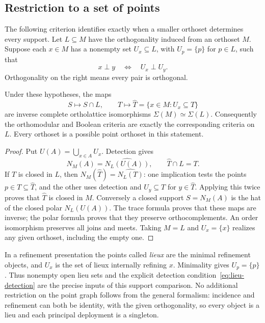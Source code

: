 \subsection{Restriction to a set of points}
The following criterion identifies exactly when a smaller orthoset
determines every support. Let $L\subseteq M$ have the orthogonality
induced from an orthoset $M$. Suppose each $x\in M$ has a nonempty
set $U_x\subseteq L$, with $U_p=\{p\}$ for $p\in L$, such that
\begin{equation}\label{eq:lieu-detection}
 x\perp y\quad\Longleftrightarrow\quad U_x\perp U_y.
\end{equation}
Orthogonality on the right means every pair is orthogonal.

\begin{proposition}\label{prop:lieu-supports}
Under these hypotheses, the maps
\[
 S\longmapsto S\cap L,\qquad
 T\longmapsto\widehat T=\{x\in M:U_x\subseteq T\}
\]
are inverse complete ortholattice isomorphisms
$\Sigma(M)\simeq\Sigma(L)$.
Consequently the orthomodular and Boolean criteria are exactly
the corresponding criteria on $L$. Every orthoset is a possible
point orthoset in this statement.
\end{proposition}
\begin{proof}
Put $U(A)=\bigcup_{x\in A}U_x$. Detection gives
\[
 N_M(A)=\widehat{N_L(U(A))},\qquad
 \widehat T\cap L=T.
\]
If $T$ is closed in $L$, then
$N_M(\widehat T)=\widehat{N_L(T)}$: one implication tests the
points $p\in T\subseteq\widehat T$, and the other uses detection
and $U_y\subseteq T$ for $y\in\widehat T$. Applying this twice
proves that $\widehat T$ is closed in $M$. Conversely a closed
support $S=N_M(A)$ is the hat of the closed polar $N_L(U(A))$.
The trace formula proves that these maps are inverse; the polar
formula proves that they preserve orthocomplements. An order
isomorphism preserves all joins and meets. Taking $M=L$ and
$U_x=\{x\}$ realizes any given orthoset, including the empty one.
\end{proof}

In a refinement presentation the points called \emph{lieux} are
the minimal refinement objects, and $U_x$ is the set of lieux
internally refining $x$. Minimality gives $U_p=\{p\}$.
Thus nonempty open lieu sets and the explicit detection
condition~\eqref{eq:lieu-detection} are the precise inputs of this
support comparison. No additional restriction on the point graph
follows from the general formalism: incidence and refinement can
both be identity, with the given orthogonality, so every object
is a lieu and each principal deployment is a singleton.


